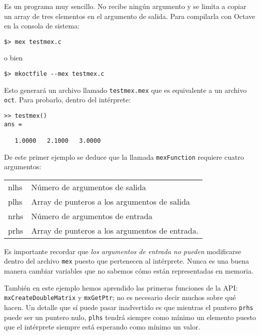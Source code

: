 Es un programa muy sencillo.  No recibe ningún argumento y se limita a
copiar un array de tres elementos en el argumento de
salida. Para compilarla con Octave en la consola de sistema:

\begin{verbatim}
$> mex testmex.c
\end{verbatim}

o bien

\begin{verbatim}
$> mkoctfile --mex testmex.c
\end{verbatim}


Esto generará un archivo llamado \texttt{testmex.mex} que es
equivalente a un archivo \texttt{oct}.  Para probarlo, dentro del
intérprete:

\begin{verbatim}
>> testmex()
ans =

   1.0000   2.1000   3.0000
\end{verbatim}

De este primer ejemplo se deduce que la llamada \texttt{mexFunction}
requiere cuatro argumentos:

\begin{tabular}{ll}
nlhs & Número de argumentos de salida \\ 
plhs & Array de punteros a los argumentos de salida \\ 
nrhs & Número de argumentos de entrada \\ 
prhs & Array de punteros a los argumentos de entrada.
\end{tabular}

Es importante recordar que \emph{los argumentos de entrada no pueden}
modificarse dentro del archivo \texttt{mex} puesto que pertenecen
al intérprete.  Nunca es una buena manera cambiar variables que no
sabemos cómo están representadas en memoria.

También en este ejemplo hemos aprendido las primeras funciones de la
API: \texttt{mxCreateDoubleMatrix} y \texttt{mxGetPtr}; no es
necesario decir muchos sobre qué hacen.  Un detalle que sí puede pasar
inadvertido es que mientras el puntero \texttt{prhs} puede ser un
puntero nulo, \texttt{plhs} tendrá siempre como mínimo un elemento
puesto que el intérprete siempre está esperando como mínimo un valor.
